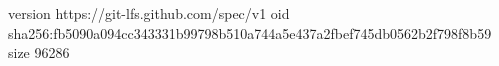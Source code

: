 version https://git-lfs.github.com/spec/v1
oid sha256:fb5090a094cc343331b99798b510a744a5e437a2fbef745db0562b2f798f8b59
size 96286
